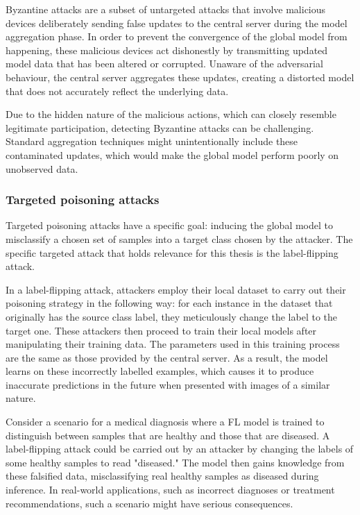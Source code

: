Byzantine attacks are a subset of untargeted attacks that involve malicious devices deliberately sending false updates to the central server during the model aggregation phase. In order to prevent the convergence of the global model from happening, these malicious devices act dishonestly by transmitting updated model data that has been altered or corrupted. Unaware of the adversarial behaviour, the central server aggregates these updates, creating a distorted model that does not accurately reflect the underlying data.

Due to the hidden nature of the malicious actions, which can closely resemble legitimate participation, detecting Byzantine attacks can be challenging.  Standard aggregation techniques might unintentionally include these contaminated updates, which would make the global model perform poorly on unobserved data.

\subsubsection{Targeted poisoning attacks}\label{sec:targeted}
Targeted poisoning attacks have a specific goal: inducing the global model to misclassify a chosen set of samples into a target class chosen by the attacker.
The specific targeted attack that holds relevance for this thesis is the label-flipping attack.

In a label-flipping attack, attackers employ their local dataset to carry out their poisoning strategy in the following way: for each instance in the dataset that originally has the source class label, they meticulously change the label to the target one. These attackers then proceed to train their local models after manipulating their training data. The parameters used in this training process are the same as those provided by the central server. As a result, the model learns on these incorrectly labelled examples, which causes it to produce inaccurate predictions in the future when presented with images of a similar nature.

Consider a scenario for a medical diagnosis where a FL model is trained to distinguish between samples that are healthy and those that are diseased. A label-flipping attack could be carried out by an attacker by changing the labels of some healthy samples to read "diseased." The model then gains knowledge from these falsified data, misclassifying real healthy samples as diseased during inference. In real-world applications, such as incorrect diagnoses or treatment recommendations, such a scenario might have serious consequences. 

